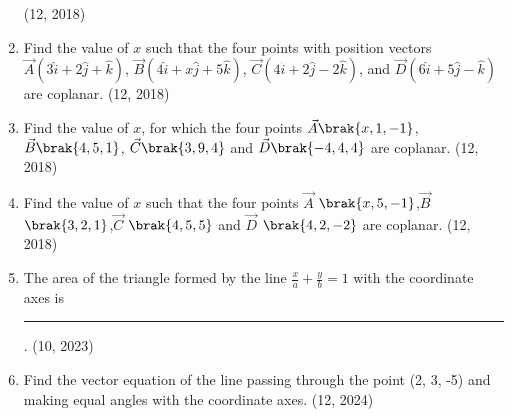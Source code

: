 \begin{enumerate}[label=\thesubsection.\arabic*, ref=\thesubsection.\theenumi]
	\hfill (12, 2018)
\item Find the value of $x$ such that the four points with position vectors $\vec{A}(3\hat{i} + 2\hat{j} + \hat{k})$, $\vec{B}(4\hat{i} + x\hat{j} + 5\hat{k})$, $\vec{C}(4\hat{i} + 2\hat{j} - 2\hat{k})$, and $\vec{D}(6\hat{i} + 5\hat{j} - \hat{k})$ are coplanar. \hfill (12, 2018)
\item Find the value of $x$, for which the four points $\vec{A}\brak{x,1,-1}$, $\vec{B}\brak{4,5,1}$, $\vec{C}\brak{3,9,4}$ and $\vec{D}\brak{-4,4,4}$ are coplanar.
\hfill (12, 2018)
\item  Find the value of $x$ such that the four points $\vec{A}$ $\brak{x,5,-1}$,$\vec{B}$ $\brak{3,2,1}$,$\vec{C}$ $\brak{4,5,5}$ and $\vec{D}$ $\brak{4,2,-2}$ are coplanar.
\hfill (12, 2018) 
    \item The area of the triangle formed by the line $ \frac{x}{a} + \frac{y}{b} = 1 $ with the coordinate axes is 
\rule{1cm}{0.1pt}.
    \hfill (10, 2023)
\item Find the vector equation of the line passing through the point (2, 3, -5) and making equal angles with the coordinate axes.
		\hfill (12, 2024)
\end{enumerate}
